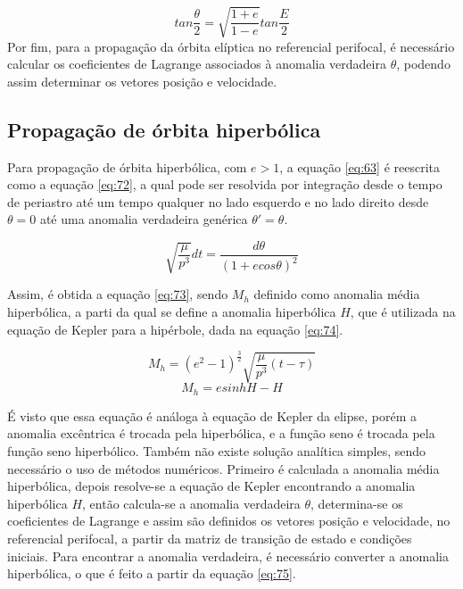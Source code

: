 \begin{equation}
    tan\frac{\theta}{2} = \sqrt{\frac{1+e}{1-e}}tan\frac{E}{2}
    \label{eq:71}
\end{equation}
Por fim, para a propagação da órbita elíptica no referencial perifocal, é necessário calcular os coeficientes de Lagrange associados à anomalia verdadeira $\theta$, podendo assim determinar os vetores posição e velocidade.


\subsection{Propagação de órbita hiperbólica}

Para propagação de órbita hiperbólica, com $e >1$, a equação \ref{eq:63} é reescrita como a equação \ref{eq:72}, a qual pode ser resolvida por integração desde o tempo de periastro até um tempo qualquer no lado esquerdo e no lado direito desde $\theta = 0$ até uma anomalia verdadeira genérica $\theta' = \theta$.

\begin{equation}
\sqrt{\frac{\mu}{p^{3}}}dt = \frac{d\theta}{(1+ecos\theta)^{2}}
    \label{eq:72}
\end{equation}

Assim, é obtida a equação \ref{eq:73}, sendo $M_{h}$ definido como anomalia média hiperbólica, a parti da qual se define a anomalia hiperbólica $H$, que é utilizada na equação de Kepler para a hipérbole, dada na equação \ref{eq:74}.

\begin{equation}
M_{h} = (e^{2}-1)^{\frac{3}{2}}\sqrt{\frac{\mu}{p^{3}} (t-\tau)}
    \label{eq:73}
\end{equation}
\begin{equation}
    M_{h} = esinhH-H
    \label{eq:74}
\end{equation}

É visto que essa equação é análoga à equação de Kepler da elipse, porém a anomalia excêntrica é trocada pela hiperbólica, e a função seno é trocada pela função seno hiperbólico. Também não existe solução analítica simples, sendo necessário o uso de métodos numéricos. Primeiro é calculada a anomalia média hiperbólica, depois resolve-se a equação de Kepler encontrando a anomalia hiperbólica $H$, então calcula-se a anomalia verdadeira $\theta$, determina-se os coeficientes de Lagrange e assim são definidos os vetores posição e velocidade, no referencial perifocal, a partir da matriz de transição de estado e condições iniciais. Para encontrar a anomalia verdadeira, é necessário converter a anomalia hiperbólica, o que é feito a partir da equação \ref{eq:75}.

